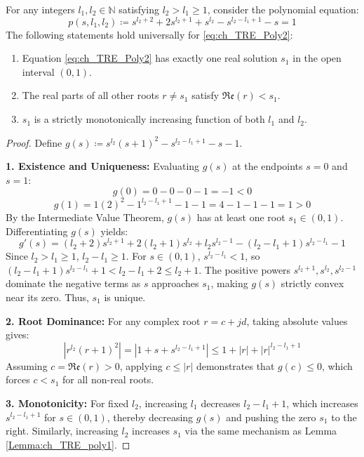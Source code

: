 \begin{lemma}\label{Lemma:ch_TRE_poly2}
For any integers $l_1, l_2 \in \mathbb{N}$ satisfying $l_2 > l_1 \ge 1$, consider the polynomial equation:
\begin{equation} \label{eq:ch_TRE_Poly2}
	p(s, l_1, l_2) \coloneqq s^{l_2+2} + 2s^{l_2+1} + s^{l_2} - s^{l_2-l_1+1} - s = 1
\end{equation}
The following statements hold universally for \eqref{eq:ch_TRE_Poly2}:
\begin{enumerate}
	\item Equation \eqref{eq:ch_TRE_Poly2} has exactly one real solution $s_1$ in the open interval $(0,1)$.
	\item The real parts of all other roots $r \neq s_1$ satisfy $\mathfrak{Re}(r) < s_1$.
	\item $s_1$ is a strictly monotonically increasing function of both $l_1$ and $l_2$.
\end{enumerate}
\end{lemma}

\begin{proof}
Define $g(s) \coloneqq s^{l_2}(s+1)^2 - s^{l_2-l_1+1} - s - 1$. 

\textbf{1. Existence and Uniqueness:} Evaluating $g(s)$ at the endpoints $s=0$ and $s=1$:
\begin{equation}
	g(0) = 0 - 0 - 0 - 1 = -1 < 0
\end{equation}
\begin{equation}
	g(1) = 1(2)^2 - 1^{l_2-l_1+1} - 1 - 1 = 4 - 1 - 1 - 1 = 1 > 0
\end{equation}
By the Intermediate Value Theorem, $g(s)$ has at least one root $s_1 \in (0,1)$. Differentiating $g(s)$ yields:
\begin{equation}
	g'(s) = (l_2+2)s^{l_2+1} + 2(l_2+1)s^{l_2} + l_2 s^{l_2-1} - (l_2-l_1+1)s^{l_2-l_1} - 1
\end{equation}
Since $l_2 > l_1 \ge 1$, $l_2 - l_1 \ge 1$. For $s \in (0,1)$, $s^{l_2-l_1} < 1$, so $(l_2-l_1+1)s^{l_2-l_1} + 1 < l_2 - l_1 + 2 \le l_2 + 1$. The positive powers $s^{l_2+1}, s^{l_2}, s^{l_2-1}$ dominate the negative terms as $s$ approaches $s_1$, making $g(s)$ strictly convex near its zero. Thus, $s_1$ is unique.

\textbf{2. Root Dominance:} For any complex root $r = c + j d$, taking absolute values gives:
\begin{equation}
	|r^{l_2}(r+1)^2| = |1 + s + s^{l_2-l_1+1}| \le 1 + |r| + |r|^{l_2-l_1+1}
\end{equation}
Assuming $c = \mathfrak{Re}(r) > 0$, applying $c \le |r|$ demonstrates that $g(c) \le 0$, which forces $c < s_1$ for all non-real roots.

\textbf{3. Monotonicity:} For fixed $l_2$, increasing $l_1$ decreases $l_2 - l_1 + 1$, which increases $s^{l_2-l_1+1}$ for $s \in (0,1)$, thereby decreasing $g(s)$ and pushing the zero $s_1$ to the right. Similarly, increasing $l_2$ increases $s_1$ via the same mechanism as Lemma \ref{Lemma:ch_TRE_poly1}.
\end{proof}

